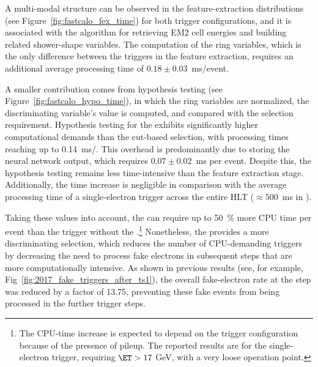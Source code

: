 A multi-modal structure can be observed in the feature-extraction distributions (see Figure~\ref{fig:fastcalo_fex_time}) for both trigger configurations, and it is associated with the algorithm for retrieving EM2 cell energies and building related shower-shape variables. The computation of the ring variables, which is the only difference between the triggers in the \fastcalo feature extraction, requires an additional average processing time of $0.18 \pm 0.03$~ms/event. 


A smaller contribution comes from hypothesis testing (see Figure~\ref{fig:fastcalo_hypo_time}), in which the ring variables are normalized, the discriminating variable's value is computed, and compared with the selection requirement. %
Hypothesis testing for the \rnn{} exhibits significantly higher computational demands than the cut-based selection, with processing times reaching up to \SI{0.14}{\ms/}. This overhead is predominantly due to storing the neural network output, which requires $0.07 \pm 0.02$~ms per event. Despite this, the hypothesis testing remains less time-intensive than the feature extraction stage.
Additionally, the time increase is negligible in comparison with the average processing time of a single-electron trigger across the entire HLT ($\approx 500$~ms in \RunTwo).

Taking these values into account, the \rnn{} can require up to \SI{50}{\%} more \fastcalo{} CPU time per event
than the trigger without the \rnn{}.\footnote{The CPU-time increase is expected to depend on the trigger configuration because of the presence of pileup. The reported results are for the single-electron trigger, requiring $\ET > 17$ GeV, with a very loose operation point.} Nonetheless, the \rnn{} provides a more discriminating selection, which reduces the number of CPU-demanding triggers by decreasing the need to process fake electrons in subsequent steps that are more computationally intensive. As shown in previous results (see, for example, Fig~\ref{fig:2017_fake_triggers_after_ts1}), the overall fake-electron rate at the \fastcalo{} step was reduced by a factor of 13.75, preventing these fake events from being processed in the further trigger steps.





